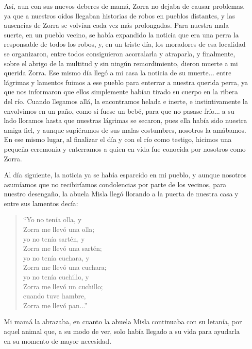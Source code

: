 Así, aun con sus nuevos deberes de mamá, Zorra no dejaba de causar problemas, ya que a nuestros oídos llegaban historias de robos en pueblos distantes, y las ausencias de Zorra se volvían cada vez más prolongadas.
Para nuestra mala suerte, en un pueblo vecino, se había expandido la noticia que era una perra la responsable de todos los robos, y, en un triste día, los moradores de esa localidad se organizaron, entre todos consiguieron acorralarla y atraparla, y finalmente, sobre el abrigo de la multitud y sin ningún remordimiento, dieron muerte a mi querida Zorra. 
Ese mismo día llegó a mi casa la noticia de su muerte... entre lágrimas y lamentos fuimos a ese pueblo para enterrar a nuestra querida perra, ya que nos informaron que ellos simplemente habían tirado su cuerpo en la ribera del río. Cuando llegamos allá, la encontramos helada e inerte, e instintivamente la envolvimos en un paño, como si fuese un bebé, para que no pasase frío... a su lado lloramos hasta que nuestras lágrimas se secaron, pues ella había sido nuestra amiga fiel, y aunque supiéramos de sus malas costumbres, nosotros la amábamos.
En ese mismo lugar, al finalizar el día y con el río como testigo, hicimos una pequeña ceremonia y enterramos a quien en vida fue conocida por nosotros como Zorra.

Al día siguiente, la noticia ya se había esparcido en mi pueblo, y aunque nosotros asumíamos que no recibiríamos condolencias por parte de los vecinos, para nuestro desengaño, la abuela Misla llegó llorando a la puerta de nuestra casa y entre sus lamentos decía:
\begin{quotation}
\noindent ``Yo no tenía olla, y \\Zorra me llevó una olla;\\ 
yo no tenía sartén, y \\Zorra me llevó una sartén;\\ 
yo no tenía cuchara, y \\Zorra me llevó una cuchara;\\
yo no tenía cuchillo, y \\Zorra me llevó un cuchillo;\\
cuando tuve hambre, \\Zorra me llevó pan...''
\end{quotation}
Mi mamá la abrazaba, en cuanto la abuela Misla continuaba con su letanía, por aquel animal que, a su modo de ver, solo había llegado a su vida para ayudarla en su momento de mayor necesidad.

